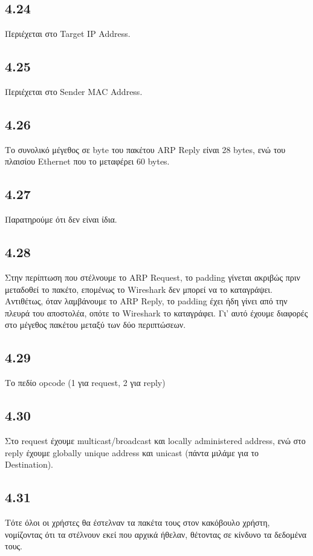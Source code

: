 		\subsection*{4.24}
			Περιέχεται στο Target IP Address.
		
		\subsection*{4.25}
			Περιέχεται στο Sender MAC Address.
		
		\subsection*{4.26}
			Το συνολικό μέγεθος σε byte του πακέτου ARP Reply είναι 28 bytes, ενώ του πλαισίου Ethernet που το μεταφέρει 60 bytes.
		
		\subsection*{4.27}
			Παρατηρούμε ότι δεν είναι ίδια.
		
		\subsection*{4.28}
			Στην περίπτωση που στέλνουμε το ARP Request, το padding γίνεται ακριβώς πριν μεταδοθεί το πακέτο, επομένως το Wireshark δεν μπορεί να το καταγράψει. Αντιθέτως, όταν λαμβάνουμε το ARP Reply, το padding έχει ήδη γίνει από την πλευρά του αποστολέα, οπότε το Wireshark το καταγράφει. Γι' αυτό έχουμε διαφορές στο μέγεθος πακέτου μεταξύ των δύο περιπτώσεων.
		
		\subsection*{4.29}
			Το πεδίο opcode (1 για request, 2 για reply)
		
		\subsection*{4.30}
			Στο request έχουμε multicast/broadcast και locally administered address, ενώ στο reply έχουμε globally unique address και unicast (πάντα μιλάμε για το Destination).
			
		\subsection*{4.31}
			Τότε όλοι οι χρήστες θα έστελναν τα πακέτα τους στον κακόβουλο χρήστη, νομίζοντας ότι τα στέλνουν εκεί που αρχικά ήθελαν, θέτοντας σε κίνδυνο τα δεδομένα τους.
